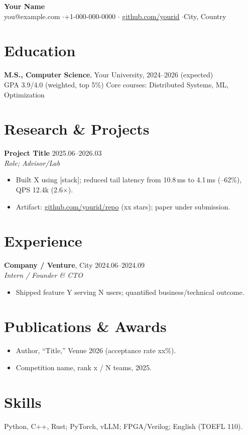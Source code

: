 \documentclass[10pt,letterpaper]{article}
\begin{document}
\pagestyle{empty}
\begin{center}
{\Large\bfseries Your Name}\\[2pt]
you@example.com \quad $\cdot$\quad +1-000-000-0000 \quad $\cdot$\quad
\href{https://github.com/yourid}{github.com/yourid} \quad $\cdot$\quad City, Country
\end{center}

\section{Education}
\textbf{M.S., Computer Science}, Your University, 2024--2026 (expected)\\
GPA 3.9/4.0 (weighted, top 5\%) \quad Core courses: Distributed Systems, ML, Optimization

\section{Research \& Projects}
\textbf{Project Title} \hfill 2025.06--2026.03\\
\textit{Role; Advisor/Lab}\\
\begin{itemize}
  \item Built X using [stack]; reduced tail latency from 10.8\,ms to 4.1\,ms (--62\%), QPS 12.4k (2.6$\times$).
  \item Artifact: \href{https://github.com/yourid/repo}{github.com/yourid/repo} (xx stars); paper under submission.
\end{itemize}

\section{Experience}
\textbf{Company / Venture}, City \hfill 2024.06--2024.09\\
\textit{Intern / Founder \& CTO}\\
\begin{itemize}
  \item Shipped feature Y serving N users; quantified business/technical outcome.
\end{itemize}

\section{Publications \& Awards}
\begin{itemize}
  \item Author, ``Title,'' Venue 2026 (acceptance rate xx\%).
  \item Competition name, rank x / N teams, 2025.
\end{itemize}

\section{Skills}
Python, C++, Rust; PyTorch, vLLM; FPGA/Verilog; English (TOEFL 110).
\end{document}
